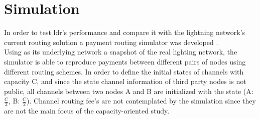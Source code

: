 \section{Simulation}

In order to test \acrshort{ldr}'s performance and compare it with the lightning network's current routing solution a payment routing simulator was developed \cite{simulator}. \\
Using as its underlying network a snapshot of the real lighting network, the simulator is able to reproduce payments between different pairs of nodes using different routing schemes. In order to define the initial states of channels with capacity C, and since the state channel information of third party nodes is not public, all channels between two nodes A and B are initialized with the state (A: $\frac{C}{2}$, B: $\frac{C}{2}$). Channel routing fee's are not contemplated by the simulation since they are not the main focus of the capacity-oriented study.\\

